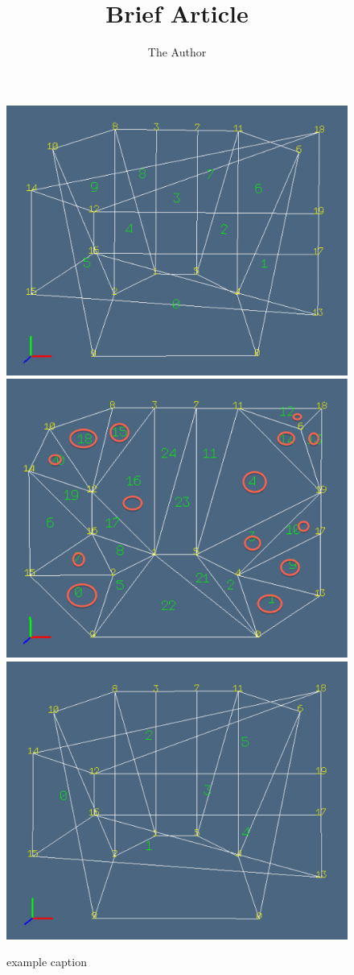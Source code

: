 \documentclass[11pt, oneside]{article}   	%
\title{Brief Article}
\author{The Author}
\begin{document}
\maketitle

\begin{figure}[htbp] %
   \centering
   \includegraphics[width=0.32\linewidth]{images/bool1} 
   \includegraphics[width=0.32\linewidth]{images/bool2} 
   \includegraphics[width=0.32\linewidth]{images/bool3} 
   \caption{example caption}
   \label{fig:example}
\end{figure}
\end{document}
